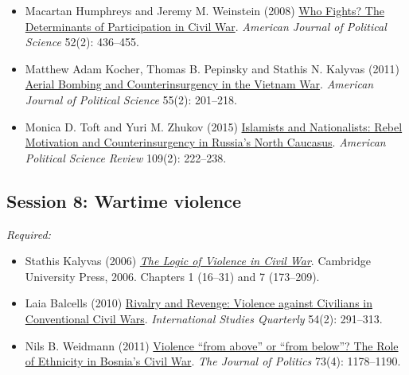 \documentclass[12pt, a4paper]{article}
\begin{document}
\begin{itemize}
	\item Macartan Humphreys and Jeremy M. Weinstein (2008) \href{https://doi.org/10.1111/j.1540-5907.2008.00322.x}{Who Fights? The Determinants of Participation in Civil War}. \textit{American Journal of Political Science} 52(2): 436--455.
	\item Matthew Adam Kocher, Thomas B. Pepinsky and Stathis N. Kalyvas (2011) \href{https://doi.org/10.1111/j.1540-5907.2010.00498.x}{Aerial Bombing and Counterinsurgency in the Vietnam War}. \textit{American Journal of Political Science} 55(2): 201--218.
	\item Monica D. Toft and Yuri M. Zhukov (2015) \href{https://doi.org/10.1017/S000305541500012X}{Islamists and Nationalists: Rebel Motivation and Counterinsurgency in Russia's North Caucasus}. \textit{American Political Science Review} 109(2): 222--238.
\end{itemize}



\vspace{20pt}
\hline
\subsection*{Session 8: Wartime violence}

\noindent\textit{Required:}

\begin{itemize}
  \item Stathis Kalyvas (2006) \href{https://bibliotecas.uc3m.es/permalink/f/1nggclj/34UC3M_ALMA21161986050004213}{\textit{The Logic of Violence in Civil War}}. Cambridge University Press, 2006. Chapters 1 (16--31) and 7 (173--209).
  \item Laia Balcells (2010) \href{https://doi.org/10.1111/j.1468-2478.2010.00588.x}{Rivalry and Revenge: Violence against Civilians in Conventional Civil Wars}. \textit{International Studies Quarterly} 54(2): 291--313.
  \item Nils B. Weidmann (2011) \href{https://doi.org/10.1017/S0022381611000831}{Violence ``from above'' or ``from below''? The Role of Ethnicity in Bosnia’s Civil War}. \textit{The Journal of Politics} 73(4): 1178--1190.
\end{itemize}
\end{document}
